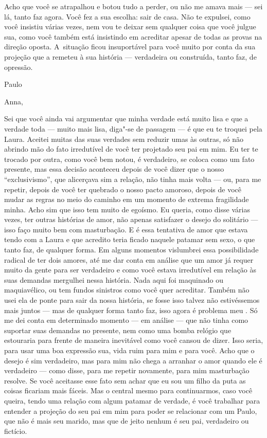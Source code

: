 Acho que você se atrapalhou e botou tudo a perder, ou não me amava mais
--- sei lá, tanto faz agora. Você fez a sua escolha: sair de casa. Não
te expulsei, como você insistiu várias vezes, nem vou te deixar sem
qualquer coisa que você julgue sua, como você também está insistindo em
acreditar apesar de todas as provas na direção oposta. A~situação ficou
insuportável para você muito por conta da sua projeção que a remeteu à
sua história --- verdadeira ou construída, tanto faz, de opressão.

\medskip{} 
\begin{flushright}Paulo\end{flushright}


\asterisc{}

Anna,

\medskip{} 

Sei que você ainda vai argumentar que minha verdade está muito lisa e
que a verdade toda --- muito mais lisa, diga"-se de passagem --- é que eu
te troquei pela Laura. Aceitei muitas das suas verdades sem reduzir umas
às outras, só não abrindo mão do fato irredutível de você ter projetado
seu pai em mim. Eu ter te trocado por outra, como você bem notou, é
verdadeiro, se coloca como um fato presente, mas essa decisão aconteceu
depois de você dizer que o nosso ``exclusivismo'', que alicerçava sim a
relação, não tinha mais volta --- ou, para me repetir, depois de você
ter quebrado o nosso pacto amoroso, depois de você mudar as regras no
meio do caminho em um momento de extrema fragilidade minha. Acho sim que
isso tem muito de egoísmo. Eu queria, como disse várias vezes, ter
outras histórias de amor, não apenas satisfazer o desejo do solitário
--- isso faço muito bem com masturbação. E é essa tentativa de amor que
estava tendo com a Laura e que acredito teria ficado naquele patamar sem
sexo, o que tanto faz, de qualquer forma. Em alguns momentos vislumbrei
essa possibilidade radical de ter dois amores, até me dar conta em
análise que um amor já requer muito da gente para ser verdadeiro e como
você estava irredutível em relação às suas demandas mergulhei nessa
história. Nada aqui foi maquinado ou maquiavélico, ou tem fundos
sinistros como você quer acreditar. Também não usei ela de ponte para
sair da nossa história, se fosse isso talvez não estivéssemos mais
juntos --- mas de qualquer forma tanto faz, isso agora é problema meu .
Só me dei conta em determinado momento --- em análise --- que não tinha
como suportar suas demandas no presente, nem como uma bomba relógio que
estouraria para frente de maneira inevitável como você cansou de dizer.
Isso seria, para usar uma boa expressão sua, vida ruim para mim e para
você. Acho que o desejo é sim verdadeiro, mas para mim não chega a
arranhar o amor quando ele é verdadeiro --- como disse, para me repetir
novamente, para mim masturbação resolve. Se você aceitasse esse fato sem
achar que eu sou um filho da puta as coisas ficariam mais fáceis. Mas o
central mesmo para continuarmos, caso você queira, tendo uma relação com
algum patamar de verdade, é você trabalhar para entender a projeção do
seu pai em mim para poder se relacionar com um Paulo, que não é mais seu
marido, mas que de jeito nenhum é seu pai, verdadeiro ou fictício.

